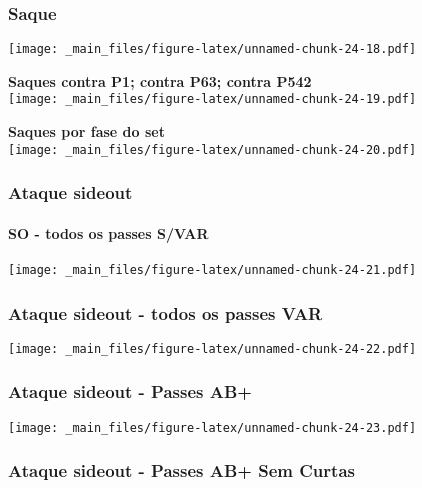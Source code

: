 \documentclass[
]{book}
\begin{document}
\subsubsection{Saque}\label{saque-1}

\texttt{[image: \_main\_files/figure-latex/unnamed-chunk-24-18.pdf]}

\textbf{Saques contra P1; contra P63; contra P542}\\
\texttt{[image: \_main\_files/figure-latex/unnamed-chunk-24-19.pdf]}

\textbf{Saques por fase do set}\\
\texttt{[image: \_main\_files/figure-latex/unnamed-chunk-24-20.pdf]} \pagebreak

\subsubsection{Ataque sideout}\label{ataque-sideout-1}

\paragraph*{SO - todos os passes S/VAR}\label{so---todos-os-passes-svar-1}

\texttt{[image: \_main\_files/figure-latex/unnamed-chunk-24-21.pdf]}

\subsubsection*{Ataque sideout - todos os passes VAR}\label{ataque-sideout---todos-os-passes-var-1}

\texttt{[image: \_main\_files/figure-latex/unnamed-chunk-24-22.pdf]}

\subsubsection{Ataque sideout - Passes AB+}\label{ataque-sideout---passes-ab-1}

\texttt{[image: \_main\_files/figure-latex/unnamed-chunk-24-23.pdf]}

\subsubsection*{Ataque sideout - Passes AB+ Sem Curtas}\label{ataque-sideout---passes-ab-sem-curtas-1}
\end{document}

